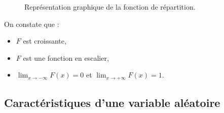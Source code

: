 \begin{ex}
\begin{figure}[H]
\begin{tikzpicture}[line cap=round,line join=round,>=triangle 45,x=1.0cm,y=5.0cm]
                                    \end{tikzpicture}
                                 \caption{Repr\'esentation graphique de la fonction de r\'epartition.}
                              \end{figure}
                              On constate que :
                              \begin{itemize}
                                    \item $F$ est croissante,
                                    \item $F$ est une fonction en escalier,
                                    \item $\lim_{x\rightarrow-\infty} F(x) = 0$ et $\lim_{x\rightarrow+\infty} F(x) = 1$.
                              \end{itemize}
                        \end{ex}
                  \subsection{Caract\'eristiques d'une variable al\'eatoire}
